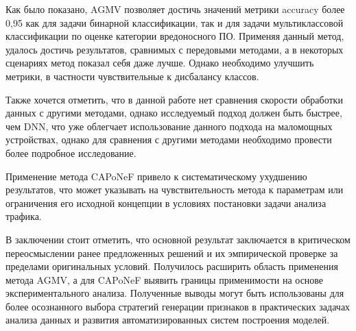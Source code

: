 
Как было показано, AGMV позволяет достичь значений метрики accuracy более 0,95 как для задачи бинарной классификации, так и для задачи мультиклассовой классификации по оценке категории вредоносного ПО. Применяя данный метод, удалось достичь результатов, сравнимых с передовыми методами, а в некоторых сценариях метод показал себя даже лучше. Однако необходимо улучшить метрики, в частности чувствительные к дисбалансу классов. 

Также хочется отметить, что в данной работе нет сравнения скорости обработки данных с другими методами, однако исследуемый подход должен быть быстрее, чем DNN, что уже облегчает использование данного подхода на маломощных устройствах, однако для сравнения с другими методами необходимо провести более подробное исследование.

Применение метода CAPoNeF привело к систематическому ухудшению результатов, что может указывать на чувствительность метода к параметрам или
ограничения его исходной концепции в условиях постановки задачи анализа трафика.

В заключении стоит отметить, что основной результат заключается в критическом переосмыслении ранее предложенных решений и их эмпирической проверке за пределами оригинальных условий. Получилось расширить область применения метода AGMV, а для CAPoNeF выявить границы применимости на основе экспериментального анализа. Полученные выводы могут быть использованы для более осознанного выбора стратегий генерации признаков в практических задачах анализа
данных и развития автоматизированных систем построения моделей.

\FloatBarrier
